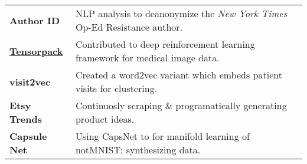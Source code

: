 \documentclass[a4paper,12pt]{article}
\begin{document}
      \begin{tabularx}{\textwidth}{p{3cm}>{\arraybackslash}X}  %



      \bfseries{Author ID} & NLP analysis to deanonymize the \textit{New York Times} Op-Ed Resistance author.\\

      \bfseries{\href{https://github.com/amiralansary/tensorpack-medical}{Tensorpack}} & Contributed to deep reinforcement learning framework for medical image data.\\

	\bfseries{visit2vec} & Created a word2vec variant which embeds patient visits for clustering.\\

	 \bfseries{Etsy Trends} & Continuosly scraping \& programatically generating product ideas.   \\





	\bfseries{Capsule Net} & Using CapsNet to for manifold learning of notMNIST; synthesizing data.

      \end{tabularx}
\end{document}
